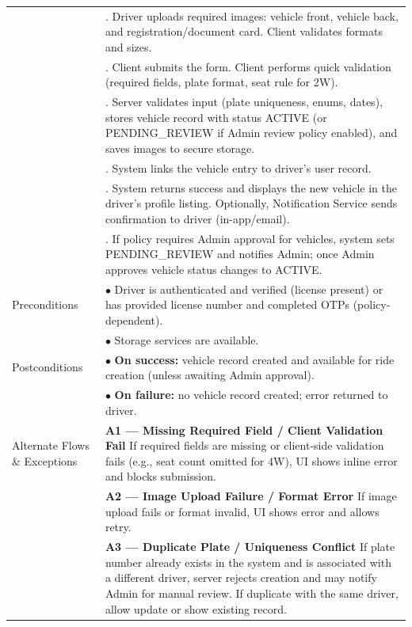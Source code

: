 \begin{longtable}{|>{\raggedright\arraybackslash}p{4cm}|>{\raggedright\arraybackslash}p{11cm}|}
& 4. Driver uploads required images: vehicle front, vehicle back, and registration/document card. Client validates formats and sizes. \\
& 5. Client submits the form. Client performs quick validation (required fields, plate format, seat rule for 2W). \\
& 6. Server validates input (plate uniqueness, enums, dates), stores vehicle record with status ACTIVE (or PENDING\_REVIEW if Admin review policy enabled), and saves images to secure storage. \\
& 7. System links the vehicle entry to driver's user record. \\
& 8. System returns success and displays the new vehicle in the driver's profile listing. Optionally, Notification Service sends confirmation to driver (in-app/email). \\
& 9. If policy requires Admin approval for vehicles, system sets PENDING\_REVIEW and notifies Admin; once Admin approves vehicle status changes to ACTIVE. \\
\hline
Preconditions & $\bullet$ Driver is authenticated and verified (license present) or has provided license number and completed OTPs (policy-dependent). \\
& $\bullet$ Storage services are available. \\
\hline
Postconditions & $\bullet$ \textbf{On success:} vehicle record created and available for ride creation (unless awaiting Admin approval). \\
& $\bullet$ \textbf{On failure:} no vehicle record created; error returned to driver. \\
\hline
Alternate Flows \& Exceptions & \textbf{A1 --- Missing Required Field / Client Validation Fail} \newline If required fields are missing or client-side validation fails (e.g., seat count omitted for 4W), UI shows inline error and blocks submission. \\
& \textbf{A2 --- Image Upload Failure / Format Error} \newline If image upload fails or format invalid, UI shows error and allows retry. \\
& \textbf{A3 --- Duplicate Plate / Uniqueness Conflict} \newline If plate number already exists in the system and is associated with a different driver, server rejects creation and may notify Admin for manual review. If duplicate with the same driver, allow update or show existing record. \\

\end{longtable}
